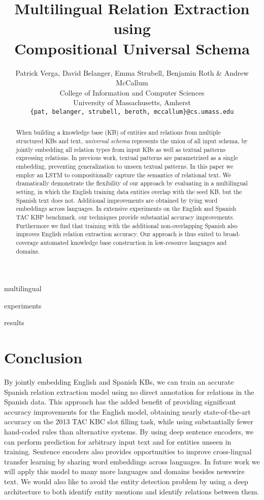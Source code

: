 \documentclass{article} %
\title{Multilingual Relation Extraction using \\Compositional Universal Schema}
\author{Patrick Verga, David Belanger, Emma Strubell, Benjamin Roth \& Andrew McCallum \\
College of Information and Computer Sciences\\
University of Massachusetts, Amherst\\
\texttt{\{pat, belanger, strubell, beroth, mccallum\}@cs.umass.edu} \\
}
\begin{document}
\maketitle

\begin{abstract}
When building a knowledge base (KB) of entities and relations from multiple structured KBs and text, \emph{universal schema} represents the union of all input schema, by jointly embedding all relation types from input KBs as well as textual patterns expressing relations.  In previous work, textual patterns are parametrized as a single embedding, preventing generalization to unseen textual patterns.  In this paper we employ an LSTM to compositionally capture the semantics of relational text.  We dramatically demonstrate the flexibility of our approach by evaluating in a multilingual setting, in which the English training data entities overlap with the seed KB, but the Spanish text does not.  Additional improvements are obtained by tying word embeddings across languages.  In extensive experiments on the English and Spanish TAC KBP benchmark, our techniques provide substantial accuracy improvements.  Furthermore we find that training with the additional non-overlapping Spanish also improves English relation extraction accuracy.  Our approach is thus suited to broad-coverage automated knowledge base construction in low-resource languages and domains.
\end{abstract}






 {multilingual}

 {experiments}

 {results}
\section{Conclusion}

By jointly embedding English and Spanish KBs, we can train an accurate Spanish relation extraction model using no direct annotation for relations in the Spanish data. This approach has the added benefit of providing significant accuracy improvements for the English model, obtaining nearly state-of-the-art accuracy on the 2013 TAC KBC slot filling task, while using substantially fewer hand-coded rules than alternative systems. By using deep sentence encoders, we can perform prediction for arbitrary input text and for entities unseen in training. Sentence encoders also provides opportunities to improve cross-lingual transfer learning by sharing word embeddings across languages. In future work we will apply this model to many more languages and domains besides newswire text. We would also like to avoid the entity detection problem by using a deep architecture to both identify entity mentions and identify relations between them.
\end{document}
